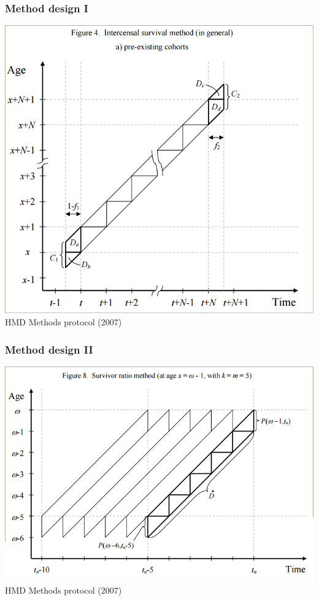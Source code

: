 \documentclass[20pt]{beamer}
\begin{document}
\begin{frame}
\frametitle{Method design I}
\includegraphics[scale=.65]{Figures/HMD_MPv5Fig4.png}\\
HMD Methods protocol (2007)
\end{frame}

\begin{frame}
\frametitle{Method design II}
\includegraphics[scale=.7]{Figures/HMD_MPv5Fig8.png}\\
HMD Methods protocol (2007)
\end{frame}
\end{document}
